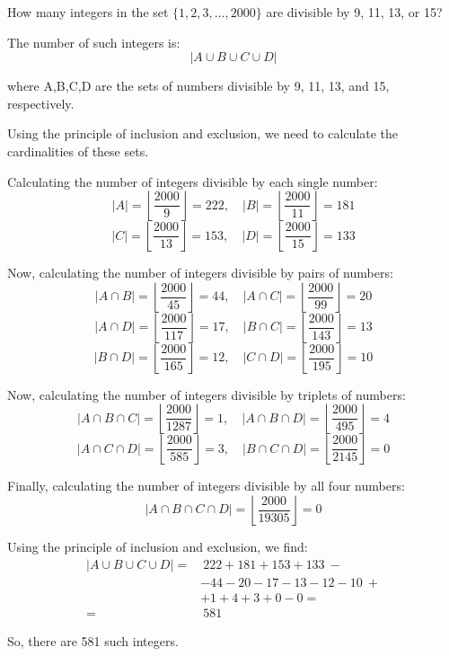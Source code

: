 \documentclass[a4paper,10pt]{article}
\begin{document}
\begin{problem}
	How many integers in the set $\{ 1,2,3,\dots,2000 \}$ are divisible by 9, 11, 13, or 15?

	The number of such integers is:
	\[
		|A \cup B \cup C \cup D|
	\]

	where A,B,C,D are the sets of numbers divisible by 9, 11, 13, and 15, respectively.

	Using the principle of inclusion and exclusion, we need to calculate the cardinalities of these sets.

	Calculating the number of integers divisible by each single number:
	\[
		|A| = \left\lfloor  \frac{2000}{9}  \right\rfloor = 222, \quad 
		|B| = \left\lfloor  \frac{2000}{11}  \right\rfloor = 181
	\]
	\[
		|C| = \left\lfloor  \frac{2000}{13}  \right\rfloor = 153, \quad |D| = \left\lfloor  \frac{2000}{15}  \right\rfloor = 133
	\]

	Now, calculating the number of integers divisible by pairs of numbers:
	\[
		|A \cap B| = \left\lfloor  \frac{2000}{45}  \right\rfloor = 44, \quad
		|A \cap C| = \left\lfloor  \frac{2000}{99}  \right\rfloor = 20
	\]
	\[
		|A \cap D| = \left\lfloor  \frac{2000}{117}  \right\rfloor = 17, \quad 
		|B \cap C| = \left\lfloor  \frac{2000}{143}  \right\rfloor = 13
	\]
	\[
		|B \cap D| = \left\lfloor  \frac{2000}{165}  \right\rfloor = 12, \quad
		|C \cap D| = \left\lfloor  \frac{2000}{195}  \right\rfloor = 10
	\]

	Now, calculating the number of integers divisible by triplets of numbers:
	\[
		|A \cap B \cap C| = \left\lfloor  \frac{2000}{1287}  \right\rfloor = 1, \quad 
		|A \cap B \cap D| = \left\lfloor  \frac{2000}{495}  \right\rfloor = 4
	\]
	\[
		|A \cap C \cap D| = \left\lfloor  \frac{2000}{585}  \right\rfloor = 3, \quad
		|B \cap C \cap D| = \left\lfloor  \frac{2000}{2145}  \right\rfloor = 0
	\]

	Finally, calculating the number of integers divisible by all four numbers:
	\[
		|A \cap B \cap C \cap D| = \left\lfloor  \frac{2000}{19305}  \right\rfloor = 0
	\]

	Using the principle of inclusion and exclusion, we find:
	\[
		\begin{aligned}
			|A \cup B \cup C \cup D| =&\ 222 + 181 + 153 + 133 \ -\\
			& - 44 - 20 - 17 - 13 - 12 - 10 \ +\\
			& + 1 + 4 + 3 + 0 - 0 = \\
			=&\ 581
		\end{aligned}
	\]

	So, there are 581 such integers.
\end{problem}
\end{document}
